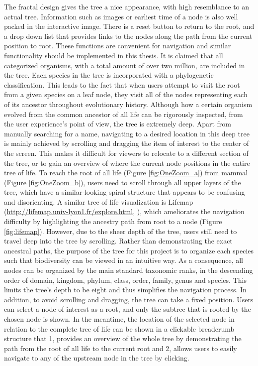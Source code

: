 \documentclass[11pt, a4paper,oneside,chapterprefix=false]{scrbook}
\begin{document}
The fractal design gives the tree a nice appearance, with high resemblance to an actual tree. Information such as images or earliest time of a node is also well packed in the interactive image. There is a reset button to return to the root, and a drop down list that provides links to the nodes along the path from the current position to root. These functions are convenient for navigation and similar functionality should be implemented in this thesis. It is claimed that all categorized organisms, with a total amount of over two million, are included in the tree. Each species in the tree is incorporated with a phylogenetic classification. This leads to the fact that when users attempt to visit the root from a given species on a leaf node, they visit all of the nodes representing each of its ancestor throughout evolutionary history. Although how a certain organism evolved from the common ancestor of all life can be rigorously inspected, from the user experience's point of view, the tree is extremely deep. Apart from manually searching for a name, navigating to a desired location in this deep tree is mainly achieved by scrolling and dragging the item of interest to the center of the screen. This makes it difficult for viewers to relocate to a different section of the tree, or to gain an overview of where the current node positions in the entire tree of life. To reach the root of all life (Figure \ref{fig:OneZoom_a}) from mammal (Figure \ref{fig:OneZoom_b}), users need to scroll through all upper layers of the tree, which have a similar-looking spiral structure that appears to be confusing and disorienting. A similar tree of life visualization is Lifemap (\url{http://lifemap.univ-lyon1.fr/explore.html}, \cite{de2016lifemap}), which ameliorates the navigation difficulty by highlighting the ancestry path from root to a node (Figure \ref{fig:lifemap}). However, due to the sheer depth of the tree, users still need to travel deep into the tree by scrolling. Rather than demonstrating the exact ancestral paths, the purpose of the tree for this project is to organize each species such that biodiversity can be viewed in an intuitive way. As a consequence, all nodes can be organized by the main standard taxonomic ranks, in the descending order of domain, kingdom, phylum, class, order, family, genus and species. This limits the tree's depth to be eight and thus simplifies the navigation process. In addition, to avoid scrolling and dragging, the tree can take a fixed position. Users can select a node of interest as a root, and only the subtree that is rooted by the chosen node is shown. In the meantime, the location of the selected node in relation to the complete tree of life can be shown in a clickable breadcrumb structure that 1, provides an overview of the whole tree by demonstrating the path from the root of all life to the current root and 2, allows users to easily navigate to any of the upstream node in the tree by clicking. \\
\end{document}
